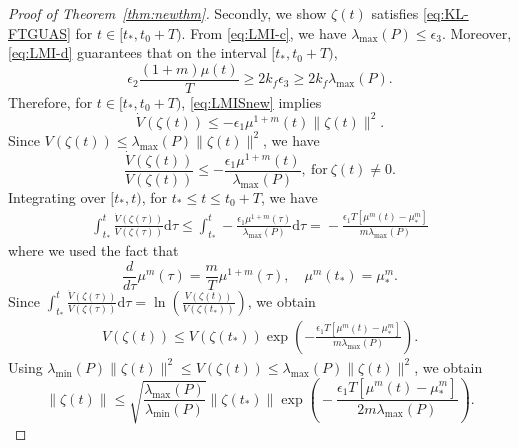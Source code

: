 \documentclass[journal]{IEEEtran}
\begin{document}
\begin{proof}[Proof of Theorem~\ref{thm:newthm}]
Secondly, we show $\zeta(t)$ satisfies \eqref{eq:KL-FTGUAS} for $t\in[t_\ast, t_0+T)$. From \eqref{eq:LMI-c}, we have $\lambda_{\max}(P) \leq \epsilon_3$. Moreover, \eqref{eq:LMI-d} guarantees that on the interval $[t_\ast,t_0+T)$,
\[
\epsilon_2\frac{(1+m)\mu(t)}{T}\geq 2k_f \epsilon_3 \geq 2k_f \lambda_{\max}(P).
\]
Therefore, for $t\in[t_\ast,t_0+T)$, \eqref{eq:LMISnew} implies
\begin{equation*}
    \dot{V}(\zeta(t)) \leq -\epsilon_1 \mu^{1+m}(t)\|\zeta(t) \|^2.
\end{equation*}
Since $V(\zeta(t))\leq \lambda_{\max}(P) \|\zeta(t)\|^2$,
we have
\begin{equation*}
\frac{\dot{V}(\zeta(t))}{V(\zeta(t))} \leq - \frac{\epsilon_1 \mu^{1+m}(t)}{\lambda_{\max}(P)}, ~\text{for}~ \zeta(t)\neq 0.
\end{equation*}
Integrating over $[t_\ast,t)$, for $t_\ast\leq t\leq t_0+T$, we have
\begin{align*}
    \int_{t_\ast}^{t} \frac{\dot{V}(\zeta(\tau))}{V(\zeta(\tau))} \mathrm{d}\tau \!\leq\!
    \int_{t_\ast}^{t}-\frac{\epsilon_1\mu^{1+m}(\tau) }{\lambda_{\max}(P)}\mathrm{d}\tau 
    \!=\! - \frac{\epsilon_1 T [\mu^m(t)-\mu^{m}_\ast]}{m \lambda_{\max}( P)}
\end{align*}
where we used the fact that
\[
\frac{d}{d\tau}\mu^m(\tau) = \frac{m}{T}\mu^{1+m}(\tau), \quad \mu^{m}(t_\ast)=\mu_\ast^{m}.
\]
Since $\int_{t_\ast}^{t} \frac{\dot{V}(\zeta(\tau))}{V(\zeta(\tau))} \mathrm{d}\tau = \ln\left(\frac{V(\zeta(t))}{V(\zeta(t_\ast))}\right)$, we obtain
\begin{align*}
    V(\zeta(t)) \leq V(\zeta(t_\ast)) \exp \left( - \frac{\epsilon_1 T[\mu^m(t) - \mu^{m}_\ast]}{m \lambda_{\max}( P)}  \right).
\end{align*}
Using $\lambda_{\min}\!(P)\|\zeta(t)\|^2 \!\leq\! V(\zeta (t)\!) \!\leq\! \lambda_{\max}\!(P)\|\zeta(t)\|^2$, we obtain
\begin{equation}
\label{eq:zeta-bound}
\| \zeta(t) \|\! \leq \!\!\sqrt{\!\frac{\lambda_{\max}(\!P)}{\lambda_{\min} (\!P)}}\| \zeta(t_\ast) \|  \exp\!\!\left(\!
     - \frac{\epsilon_1 T[\mu^m(t) - \mu^{m}_\ast]}{2m \lambda_{\max}( P)} \!
    \right).

\end{equation}
\end{proof}
\end{document}

